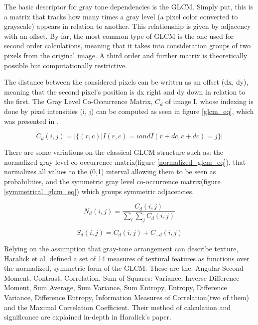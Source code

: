 \documentclass[12pt]{report}
\begin{document}
	The basic descriptor for gray tone dependencies is the GLCM. Simply put, this is a matrix that tracks how many times a gray level (a pixel color converted to grayscale) appears in relation to another. This relationship is given by adjacency with an offset. By far, the most common type of GLCM is the one used for second order calculations, meaning that it takes into consideration groups of two pixels from the original image. A third order and further matrix is theoretically possible but computationally restrictive\cite{glcm_tutorial}.
	
	The distance between the considered pixels can be written as an offset (dx, dy), meaning that the second pixel's position is dx right and dy down in relation to the first. The Gray Level Co-Occurrence Matrix, $C_d$ of image I, whose indexing is done by pixel intensities (i, j) can be computed as seen in figure \ref{glcm_eq}, which was presented in \cite{computer_vision_book}.
	
	\begin{equation} \label{glcm_eq}
	C_d(i, j) = | \{(r, c) | I(r, c) = i and I(r+dc, c + dc) = j\} |
	\end{equation}
	
	There are some variations on the classical GLCM structure such as: the normalized gray level co-occurrence matrix(figure \ref{normalized_glcm_eq}), that normalizes all values to the (0,1) interval allowing them to be seen as probabilities, and the symmetric gray level co-occurrence matrix(figure \ref{symmetrical_glcm_eq}) which groups symmetric adjacencies.
	
	\begin{equation} \label{normalized_glcm_eq}
	N_d(i, j) = \frac{C_d(i, j)}{\sum_{i}\sum_{j}C_d(i, j)}
	\end{equation}
	
	\begin{equation} \label{symmetrical_glcm_eq}
	S_d(i, j) = C_d(i, j) + C_{-d}(i, j)
	\end{equation}
	
	Relying on the assumption that gray-tone arrangement can describe texture, Haralick et al. defined a set of 14 measures of textural features as functions over the normalized, symmetric form of the GLCM. These are the: Angular Second Moment, Contrast, Correlation, Sum of Squares: Variance, Inverse Difference Moment, Sum Average, Sum Variance, Sum Entropy, Entropy, Difference Variance, Difference Entropy, Information Measures of Correlation(two of them) and the Maximal Correlation Coefficient. Their method of calculation and significance are explained in-depth in Haralick's paper\cite{haralick_features}.
	
\end{document}
